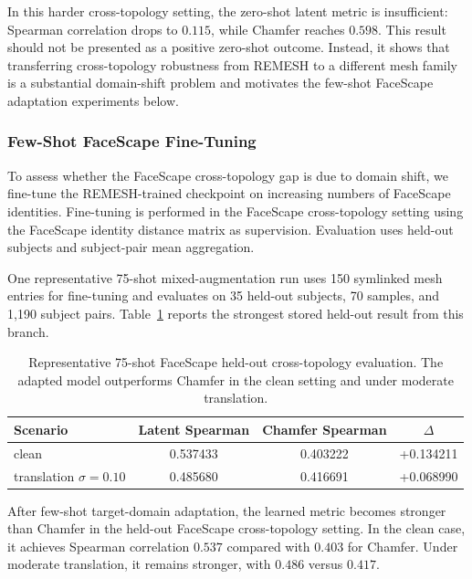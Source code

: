 In this harder cross-topology setting, the zero-shot latent metric is
insufficient: Spearman correlation drops to $0.115$, while Chamfer reaches
$0.598$. This result should not be presented as a positive zero-shot outcome.
Instead, it shows that transferring cross-topology robustness from REMESH to a
different mesh family is a substantial domain-shift problem and motivates the
few-shot FaceScape adaptation experiments below.

\subsubsection{Few-Shot FaceScape Fine-Tuning}
\label{app:faceverse_finetuning}

To assess whether the FaceScape cross-topology gap is due to domain shift, we
fine-tune the REMESH-trained checkpoint on increasing numbers of FaceScape
identities. Fine-tuning is performed in the FaceScape cross-topology setting
using the FaceScape identity distance matrix as supervision. Evaluation uses
held-out subjects and subject-pair mean aggregation.

One representative 75-shot mixed-augmentation run uses 150 symlinked mesh
entries for fine-tuning and evaluates on 35 held-out subjects, 70 samples, and
1,190 subject pairs. Table~\ref{tab:faceverse_75shot_app} reports the strongest
stored held-out result from this branch.

\begin{table}[h]
\centering
\small
\caption{
Representative 75-shot FaceScape held-out cross-topology evaluation. The adapted
model outperforms Chamfer in the clean setting and under moderate translation.
}
\label{tab:faceverse_75shot_app}
\begin{tabular}{lccc}
\toprule
Scenario & Latent Spearman & Chamfer Spearman & $\Delta$ \\
\midrule
clean & 0.537433 & 0.403222 & +0.134211 \\
translation $\sigma=0.10$ & 0.485680 & 0.416691 & +0.068990 \\
\bottomrule
\end{tabular}
\end{table}

After few-shot target-domain adaptation, the learned metric becomes stronger than
Chamfer in the held-out FaceScape cross-topology setting. In the clean case, it
achieves Spearman correlation $0.537$ compared with $0.403$ for Chamfer. Under
moderate translation, it remains stronger, with $0.486$ versus $0.417$.

